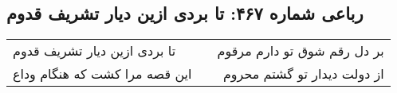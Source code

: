\begin{center}
\section*{رباعی شماره ۴۶۷: تا بردی ازین دیار تشریف قدوم}
\label{sec:sh467}
\begin{longtable}{l p{0.5cm} r}
تا بردی ازین دیار تشریف قدوم
&&
بر دل رقم شوق تو دارم مرقوم
\\
این قصه مرا کشت که هنگام وداع
&&
از دولت دیدار تو گشتم محروم
\\
\end{longtable}
\end{center}
